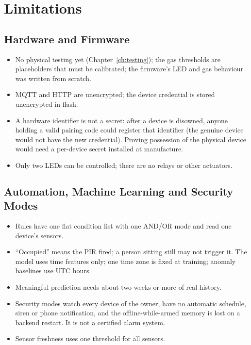 \documentclass[12pt,a4paper,oneside]{report}
\begin{document}
\chapter{Limitations}
\label{ch:limits}

\section{Hardware and Firmware}
\begin{itemize}
  \item No physical testing yet (Chapter~\ref{ch:testing}); the gas thresholds are placeholders that must be calibrated; the firmware's LED and gas behaviour was written from scratch.
  \item MQTT and HTTP are unencrypted; the device credential is stored unencrypted in flash.
  \item A hardware identifier is not a secret: after a device is disowned, anyone holding a valid pairing code could register that identifier (the genuine device would not have the new credential). Proving possession of the physical device would need a per-device secret installed at manufacture.
  \item Only two LEDs can be controlled; there are no relays or other actuators.
\end{itemize}

\section{Automation, Machine Learning and Security Modes}
\begin{itemize}
  \item Rules have one flat condition list with one AND/OR mode and read one device's sensors.
  \item ``Occupied'' means the PIR fired; a person sitting still may not trigger it. The model uses time features only; one time zone is fixed at training; anomaly baselines use UTC hours.
  \item Meaningful prediction needs about two weeks or more of real history.
  \item Security modes watch every device of the owner, have no automatic schedule, siren or phone notification, and the offline-while-armed memory is lost on a backend restart. It is not a certified alarm system.
  \item Sensor freshness uses one threshold for all sensors.
\end{itemize}
\end{document}
